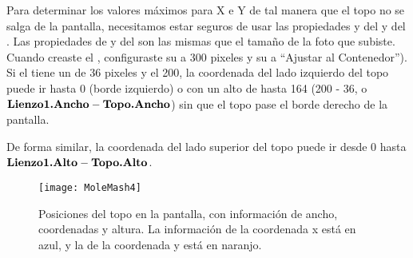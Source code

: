 Para determinar los valores máximos para X e Y de tal manera que el
topo no se salga de la pantalla, necesitamos estar seguros de usar las
propiedades  y  del  y
del . Las propiedades de  y
 del  son las mismas que el tamaño de
la foto que subiste. Cuando creaste el ,
configuraste su  a 300 pixeles y su  a
``Ajustar al Contenedor''). Si el  tiene un
 de 36 pixeles y el  200, la
coordenada  del lado izquierdo del topo puede ir hasta 0
(borde izquierdo) o con un alto de hasta 164 (200 - 36, o
$\textbf{Lienzo1.Ancho} - \textbf{Topo.Ancho}$) sin que el topo
pase el borde derecho de la pantalla.

De forma similar, la coordenada  del lado superior del
topo puede ir desde 0 hasta $\textbf{Lienzo1.Alto} -
\textbf{Topo.Alto}$.

\begin{figure}[H]
\centering
\texttt{[image: MoleMash4]}
\caption{Posiciones del topo en la pantalla, con información de ancho,
  coordenadas y altura. La información de la coordenada x está en
  azul, y la de la coordenada y está en naranjo.}
\label{fig:MoleMash4}
\end{figure}

